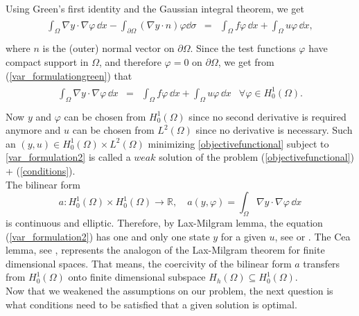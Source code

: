 \documentclass[a4paper, 11pt, twoside]{article}
\begin{document}
Using Green's first identity and the Gaussian integral theorem, we get
\begin{eqnarray}\label{var_formulationgreen}
\begin{array}{rcl}
\int_\Omega \nabla y\cdot \nabla\varphi\, \dd x - \int_{\partial\Omega} (\nabla y \cdot n) \varphi \dd \sigma &=& \int_\Omega f\varphi\, \dd x + \int_\Omega u\varphi\, \dd x , \\

\end{array}
\end{eqnarray}
where $n$ is the (outer) normal vector on $\partial \Omega$. Since the test functions $\varphi$ have compact support in $\Omega$, and therefore $\varphi=0$ on $\partial \Omega$, we get from (\ref{var_formulationgreen}) that
\begin{eqnarray}\label{var_formulation2}
\begin{array}{rcll}
\int_\Omega \nabla y\cdot \nabla\varphi\, \dd x  &=& \int_\Omega f\varphi\, \dd x + \int_\Omega u\varphi\, \dd x & \forall \varphi\in H_0^1(\Omega). \\
\end{array}
\end{eqnarray}
Now $y$ and $\varphi$ can be chosen from $H^1_0(\Omega)$ since no second derivative is required anymore and $u$ can be chosen from $L^2(\Omega)$ since no derivative is necessary. Such an $(y, u) \in H^1_0(\Omega)\times L^2(\Omega)$ minimizing \ref{objectivefunctional} subject to \ref{var_formulation2} is called a $\mathit{weak}$ solution  of the problem (\ref{objectivefunctional}) + (\ref{conditions}). \\
The bilinear form 
\[
a: H^1_0(\Omega) \times H^1_0(\Omega) \rightarrow \mathbb{R},\quad a(y,\varphi)=\int_\Omega \nabla y \cdot \nabla\varphi\, \dd x  
\]
is continuous and elliptic. Therefore, by Lax-Milgram lemma, the equation (\ref{var_formulation2})
has one and only one state $y$ for a given $u$, see \cite[Chap 5.8]{gilbarg} or \cite{mclean} . The Cea lemma, see \cite[Chap. 2.8, 2.5]{brenner}, represents the analogon of the Lax-Milgram theorem for finite dimensional spaces. 
That means, the coercivity of the bilinear form $a$ transfers from $H^1_0(\Omega)$ onto finite dimensional subspace $H_h(\Omega) \subseteq H^1_0(\Omega)$. \\
Now that we weakened the assumptions on our problem, the next question is what conditions need to be satisfied that a given solution is optimal. \\
\end{document}
